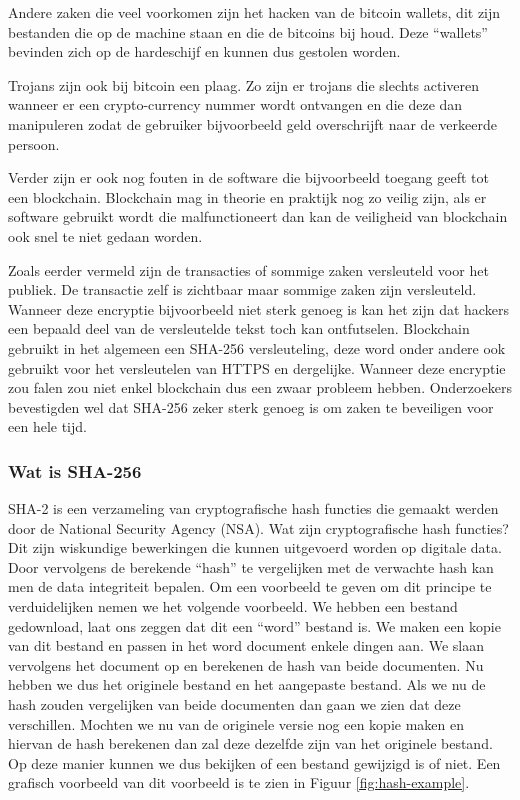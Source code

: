 Andere zaken die veel voorkomen zijn het hacken van de bitcoin wallets, dit zijn bestanden die op de machine staan en die de bitcoins bij houd. Deze ``wallets'' bevinden zich op de hardeschijf en kunnen dus gestolen worden. 

Trojans zijn ook bij bitcoin een plaag. Zo zijn er trojans die slechts activeren wanneer er een crypto-currency nummer wordt ontvangen en die deze dan manipuleren zodat de gebruiker bijvoorbeeld geld overschrijft naar de verkeerde persoon. 

Verder zijn er ook nog fouten in de software die bijvoorbeeld toegang geeft tot een blockchain. Blockchain mag in theorie en praktijk nog zo veilig zijn, als er software gebruikt wordt die malfunctioneert dan kan de veiligheid van blockchain ook snel te niet gedaan worden.

Zoals eerder vermeld zijn de transacties of sommige zaken versleuteld voor het publiek. De transactie zelf is zichtbaar maar sommige zaken zijn versleuteld. Wanneer deze encryptie bijvoorbeeld niet sterk genoeg is kan het zijn dat hackers een bepaald deel van de versleutelde tekst toch kan ontfutselen. Blockchain gebruikt in het algemeen een SHA-256 versleuteling, deze word onder andere ook gebruikt voor het versleutelen van HTTPS en dergelijke. Wanneer deze encryptie zou falen zou niet enkel blockchain dus een zwaar probleem hebben. Onderzoekers bevestigden wel dat SHA-256 zeker sterk genoeg is om zaken te beveiligen voor een hele tijd.

\subsubsection{Wat is SHA-256}
SHA-2 is een verzameling van cryptografische hash functies die gemaakt werden door de National Security Agency (NSA). Wat zijn cryptografische hash functies? Dit zijn wiskundige bewerkingen die kunnen uitgevoerd worden op digitale data. Door vervolgens de berekende ``hash'' te vergelijken met de verwachte hash kan men de data integriteit bepalen. Om een voorbeeld te geven om dit principe te verduidelijken nemen we het volgende voorbeeld. We hebben een bestand gedownload, laat ons zeggen dat dit een ``word'' bestand is. We maken een kopie van dit bestand en passen in het word document enkele dingen aan. We slaan vervolgens het document op en berekenen de hash van beide documenten. Nu hebben we dus het originele bestand en het aangepaste bestand. Als we nu de hash zouden vergelijken van beide documenten dan gaan we zien dat deze verschillen. Mochten we nu van de originele versie nog een kopie maken en hiervan de hash berekenen dan zal deze dezelfde zijn van het originele bestand. Op deze manier kunnen we dus bekijken of een bestand gewijzigd is of niet. Een grafisch voorbeeld van dit voorbeeld is te zien in Figuur \ref{fig:hash-example}.

